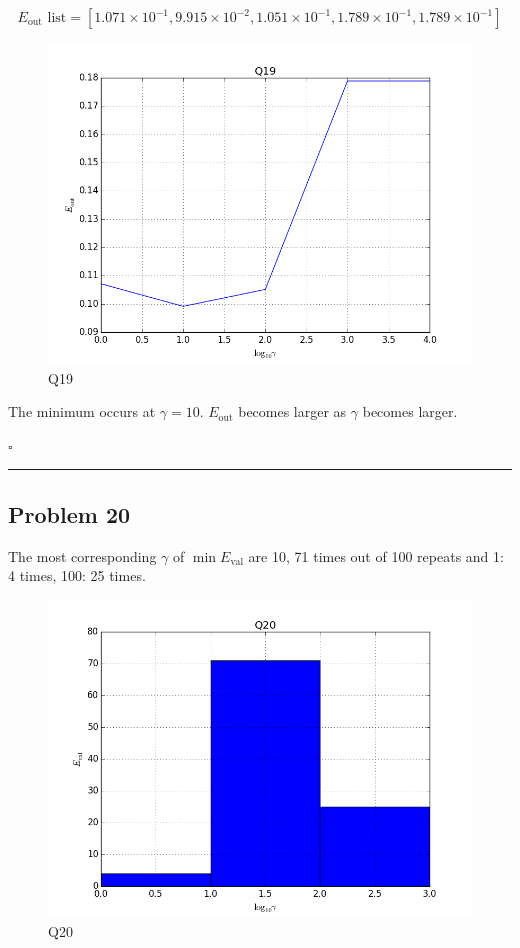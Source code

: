 \documentclass[12pt]{article}
\newcommand*{\QEDB}{\hfill\ensuremath{\square}}
\newcommand{\SBrackets}[1]{\left[#1\right]}
\newcommand{\SciNum}[2]{#1\times{10}^{#2}}
\newcommand{\horrule}[1]{\rule{\linewidth}{#1}}
\begin{document}
\begin{align}
E_{\text{out}}\text{ list}=\SBrackets{\SciNum{1.071}{-1}, \SciNum{9.915}{-2}, \SciNum{1.051}{-1}, \SciNum{1.789}{-1}, \SciNum{1.789}{-1}}
\end{align}
\begin{figure}[H]
	\centering
	\includegraphics[scale=0.5]{Q19.png}
	\caption{Q19}
	\label{Q19}
\end{figure}
The minimum occurs at $\gamma=10$. $E_{\text{out}}$ becomes larger as $\gamma$ becomes larger.

\QEDB

\horrule{0.5pt}

\subsection*{Problem 20}

The most corresponding $\gamma$ of $\min E_{\text{val}}$ are 10, 71 times out of 100 repeats and 1: 4 times, 100: 25 times.
\begin{figure}[H]
	\centering
	\includegraphics[scale=0.5]{Q20.png}
	\caption{Q20}
	\label{Q20}
\end{figure}
\end{document}
